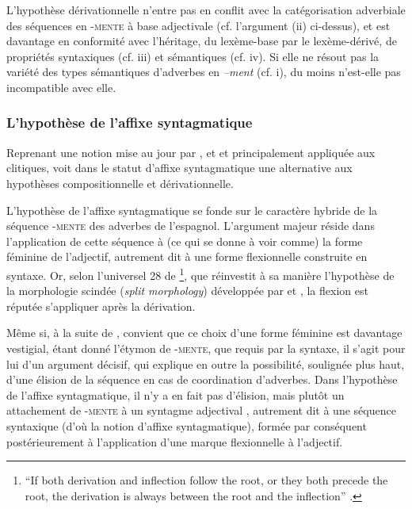 \documentclass[output=paper]{langsci/langscibook}
\begin{document}
L'hypothèse dérivationnelle n'entre pas en conflit avec la catégorisation adverbiale des séquences en -\textsc{mente} à base adjectivale (cf. l'argument (ii) ci-dessus), et est davantage en conformité avec l'héritage, du lexème-base par le lexème-dérivé, de propriétés syntaxiques (cf. iii) et sémantiques (cf. iv). Si elle ne résout pas la variété des types sémantiques d'adverbes en \emph{--ment} (cf. i), du moins n'est-elle pas incompatible avec elle.

\subsubsection{L'hypothèse de l'affixe syntagmatique}\label{section:dal:2.1.3}

Reprenant une notion mise au jour par %
\citet{Zwicky1987c}%
%
, %
\citet{Nevis85} %
%
et %
\citet{Miller92} %
%
et principalement appliquée aux clitiques, %
\citet{Torner2005,Torner2016} %
%
 voit dans le statut d'affixe syntagmatique une alternative aux hypothèses compositionnelle et dérivationnelle.

L'hypothèse de l'affixe syntagmatique se fonde sur le caractère hybride de la séquence -\textsc{mente} des adverbes de l'espagnol. L'argument majeur réside dans l'application de cette séquence à (ce qui se donne à voir comme) la forme féminine de l'adjectif, autrement dit à une forme flexionnelle construite en syntaxe. Or, selon l'universel 28 de %
\citet{Greenberg1963}%
%
\footnote{``If both derivation and inflection follow the root, or they both precede the root, the derivation is always between the root and the inflection'' %
\citep[93]{Greenberg1963}%
%
.}, que réinvestit à sa manière l'hypothèse de la morphologie scindée (\emph{split morphology}) développée par %
\citet{Anderson77,Anderson82,Anderson92} %
%
et %
\citet{Perlmutter88}%
%
, la flexion est réputée s'appliquer après la dérivation.

Même si, à la suite de %
\citet[87]{Rainer96}%
%
, %
\citet[131]{Torner2005} %
%
 convient que ce choix d'une forme féminine est davantage vestigial, étant donné l'étymon de -\textsc{mente}, que requis par la syntaxe, il s'agit pour lui d'un argument décisif, qui explique en outre la possibilité, soulignée plus haut, d'une élision de la séquence en cas de coordination d'adverbes. Dans l'hypothèse de l'affixe syntagmatique, il n'y a en fait pas d'élision, mais plutôt un attachement de -\textsc{mente} à un syntagme adjectival %
\citep[132]{Torner2005}%
%
, autrement dit à une séquence syntaxique (d'où la notion d'affixe syntagmatique), formée par conséquent postérieurement à l'application d'une marque flexionnelle à l'adjectif.
\end{document}

